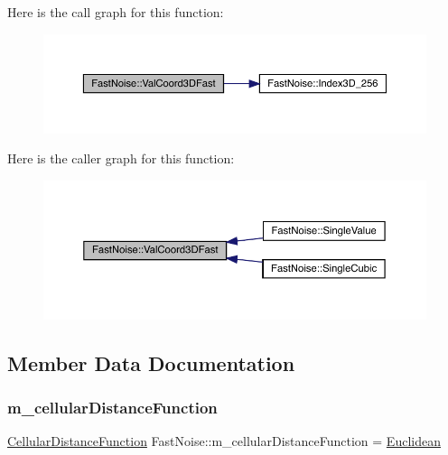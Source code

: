 Here is the call graph for this function\+:
\nopagebreak
\begin{figure}[H]
\begin{center}
\leavevmode
\includegraphics[width=350pt]{d1/dd8/class_fast_noise_a8711ebad77216b74f5d248deb024de2f_cgraph}
\end{center}
\end{figure}
Here is the caller graph for this function\+:
\nopagebreak
\begin{figure}[H]
\begin{center}
\leavevmode
\includegraphics[width=350pt]{d1/dd8/class_fast_noise_a8711ebad77216b74f5d248deb024de2f_icgraph}
\end{center}
\end{figure}


\subsection{Member Data Documentation}
\mbox{\label{class_fast_noise_a2013ce945eec3663ae04a5b36d3fdff8}} 
\subsubsection{\texorpdfstring{m\+\_\+cellular\+Distance\+Function}{m\_cellularDistanceFunction}}
{\footnotesize\ttfamily \mbox{\hyperlink{class_fast_noise_a457e58d0da6dbe486deb5a21a3db52bf}{Cellular\+Distance\+Function}} Fast\+Noise\+::m\+\_\+cellular\+Distance\+Function = \mbox{\hyperlink{class_fast_noise_a457e58d0da6dbe486deb5a21a3db52bfa71b164a880847b07288ce70507bf1453}{Euclidean}}\hspace{0.3cm}{\ttfamily [private]}}

